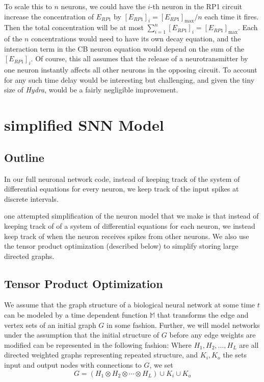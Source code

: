 \documentclass{article}
\newcommand{\M}{\mathbb{M}}
\begin{document}
To scale this to $n$ neurons, we could have the $i$-th neuron in the RP1 circuit increase the concentration of $E_{RP1}$ by $[E_{RP1}]_{i}=[E_{RP1}]_{\max}/n$ each time it fires. Then the total concentration will be at most $\sum_{i=1}^{n}[E_{RP1}]_{i}=[E_{RP1}]_{\max}$. Each of the $n$ concentrations would need to have its own decay equation, and the interaction term in the CB neuron equation would depend on the sum of the $[E_{RP1}]_{i}$. Of course, this all assumes that the release of a neurotransmitter by one neuron instantly affects all other neurons in the opposing circuit. To account for any such time delay would be interesting but challenging, and given the tiny size of \textit{Hydra}, would be a fairly negligible improvement. 

\newpage

\section{simplified SNN Model}

\subsection{Outline}


In our full neuronal network code, instead of keeping track of the system of differential equations for every neuron, we keep track of the input spikes at discrete intervals.

one attempted simplification of the neuron model that we make is that instead of keeping track of of a system of differential equations for each neuron, we instead keep track of when the neuron receives spikes from other neurons. We also use the tensor product optimization (described below) to simplify storing large directed graphs.

\subsection{Tensor Product Optimization}

We assume that the graph structure of a biological neural network at some time $t$ can be modeled by a time dependent function $\M$ that transforms the edge and vertex sets of an initial graph $G$ in some fashion. Further, we will model networks under the assumption that the initial structure of $G$ before any edge weights are modified can be represented in the following fashion:
Where $H_1, H_2, \ldots, H_L$ are all directed weighted graphs representing repeated structure, and $K_i , K_o$ the sets input and output nodes with connections to $G$, we set  
$$ G = (H_1 \otimes H_2 \otimes \cdots \otimes H_L) \cup K_i \cup K_o $$
\end{document}
